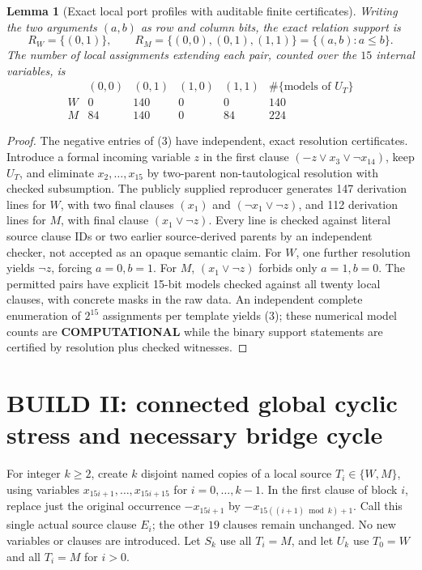 \documentclass[10pt]{article}
\newtheorem{lemma}[theorem]{Lemma}
\begin{document}
\begin{lemma}[Exact local port profiles with auditable finite certificates]\label{lem:profiles}
Writing the two arguments $(a,b)$ as row and column bits, the exact relation support is
\[
 R_W=\{(0,1)\},\qquad R_M=\{(0,0),(0,1),(1,1)\}=\{(a,b):a\le b\}.\tag{2}
\]
The number of local assignments extending each pair, counted over the $15$ internal variables, is
\[
\begin{array}{c|rrrr|r}
& (0,0)&(0,1)&(1,0)&(1,1)&\#\{\text{models of }U_T\}\\\hline
W&0&140&0&0&140\\
M&84&140&0&84&224
\end{array}\tag{3}
\]
\end{lemma}
\begin{proof}
The negative entries of (3) have independent, exact resolution certificates. Introduce a formal incoming variable $z$ in the first clause $(-z\lor x_3\lor\neg x_{14})$, keep $U_T$, and eliminate $x_2,\ldots,x_{15}$ by two-parent non-tautological resolution with checked subsumption. The publicly supplied reproducer generates 147 derivation lines for $W$, with two final clauses $(x_1)$ and $(\neg x_1\lor\neg z)$, and 112 derivation lines for $M$, with final clause $(x_1\lor\neg z)$. Every line is checked against literal source clause IDs or two earlier source-derived parents by an independent checker, not accepted as an opaque semantic claim. For $W$, one further resolution yields $\neg z$, forcing $a=0,b=1$. For $M$, $(x_1\lor\neg z)$ forbids only $a=1,b=0$. The permitted pairs have explicit 15-bit models checked against all twenty local clauses, with concrete masks in the raw data. An independent complete enumeration of $2^{15}$ assignments per template yields (3); these numerical model counts are \textbf{COMPUTATIONAL} while the binary support statements are certified by resolution plus checked witnesses.\end{proof}

\section{BUILD II: connected global cyclic stress and necessary bridge cycle}
For integer $k\ge2$, create $k$ disjoint named copies of a local source $T_i\in\{W,M\}$, using variables $x_{15i+1},\ldots,x_{15i+15}$ for $i=0,\ldots,k-1$. In the first clause of block $i$, replace just the original occurrence $-x_{15i+1}$ by $-x_{15((i+1)\bmod k)+1}$. Call this single actual source clause $E_i$; the other $19$ clauses remain unchanged. No new variables or clauses are introduced. Let $S_k$ use all $T_i=M$, and let $U_k$ use $T_0=W$ and all $T_i=M$ for $i>0$.
\end{document}
